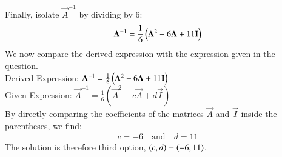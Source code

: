 \documentclass[journal]{IEEEtran}
\theoremstyle{remark}
\begin{document}
Finally, isolate $\vec{A}^{-1}$ by dividing by 6:
\begin{align}
\mathbf{A}^{-1} = \frac{1}{6}\left(\mathbf{A}^2 - 6\mathbf{A} + 11\mathbf{I}\right)
\end{align}
We now compare the derived expression  with the expression given in the question.\\
Derived Expression: $\mathbf{A}^{-1} = \frac{1}{6}\left(\mathbf{A}^2 - 6\mathbf{A} + 11\mathbf{I}\right)$\\
Given Expression: $\vec{A}^{-1} = \frac{1}{6}(\vec{A}^2 + c\vec{A} + d\vec{I})$\\
By directly comparing the coefficients of the matrices $\vec{A}$ and $\vec{I}$ inside the parentheses, we find:
\begin{align}
c = -6 \quad \text{and} \quad d = 11
\end{align}
The solution is therefore third option, $\left(c, d\right) = \left(-6, 11\right)$.
\end{document}
